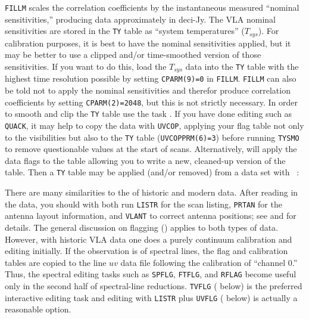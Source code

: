 {\tt FILLM} scales the correlation coefficients by the instantaneous
measured ``nominal sensitivities,'' producing data approximately in
deci-Jy.   The VLA nominal sensitivities are stored in the {\tt TY}
table as ``system temperatures'' ($T_{sys}$)\@.  For calibration
purposes, it is best to have the nominal sensitivities applied, but it
may be better to use a clipped and/or time-smoothed version of those
sensitivities.  If you want to do this, load the $T_{sys}$ data into
the {\tt TY} table with the highest time resolution possible by
setting {\tt CPARM(9)=0} in {\tt FILLM}\@.  {\tt FILLM} can also be
told not to apply the nominal sensitivities and therefor produce
correlation coefficients by setting {\tt CPARM(2)=2048}, but this is
not strictly necessary.  In order to smooth and clip the {\tt TY}
table use the task {\tt {}}\@.  If you have done editing
such as {\tt QUACK}, it may help to copy the data with {\tt UVCOP},
applying your flag table not only to the visibilities but also to the
{\tt TY} table ({\tt UVCOPPRM(6)=3}) before running {\tt TYSMO} to
remove questionable values at the start of scans.  Alternatively,
{\tt {}} will apply the data flags to the table allowing you
to write a new, cleaned-up version of the table.  Then a {\tt TY}
table may be applied (and/or removed) from a data set with {\tt
{}}\@:


There are many similarities to the  of historic and
modern  data.  After reading in the data, you should with
both run {\tt LISTR} for the scan listing, {\tt PRTAN} for the antenna
layout information, and {\tt VLANT} to correct antenna positions; see
 and  for details.  The general discussion
on flagging () applies to both types of data.  However,
with historic VLA data one does a purely continuum calibration and
editing initially.  If the observation is of spectral lines, the flag
and calibration tables are copied to the line $uv$ data file following
the calibration of ``channel 0.''  Thus, the spectral editing tasks
such as {\tt SPFLG}, {\tt FTFLG}, and {\tt RFLAG} become useful only
in the second half of spectral-line reductions.  {\tt TVFLG}
( below) is the preferred interactive editing task and
editing with {\tt LISTR} plus {\tt UVFLG} ( below) is
actually a reasonable option.

